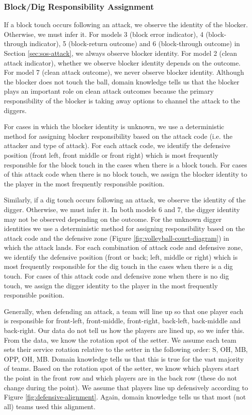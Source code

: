 \documentclass[USenglish]{article}
\theoremstyle{dgthm}
\theoremstyle{dgdef}
\begin{document}
\subsubsection{Block/Dig Responsibility Assignment}
\label{sec:block-dig-responsibility}

If a block touch occurs following an attack, we observe the identity of the blocker. Otherwise, we must infer it. For models 3 (block error indicator), 4 (block-through indicator), 5 (block-return outcome) and 6 (block-through outcome) in Section \ref{sec:sos-attack}, we always observe blocker identity. For model 2 (clean attack indicator), whether we observe blocker identity depends on the outcome. For model 7 (clean attack outcome), we never observe blocker identity. Although the blocker does not touch the ball, domain knowledge tells us that the blocker plays an important role on clean attack outcomes because the primary responsibility of the blocker is taking away options to channel the attack to the diggers.

For cases in which the blocker identity is unknown, we use a deterministic method for assigning blocker responsibility based on the attack code (i.e. the attacker and type of attack). For each attack code, we identify the defensive position (front left, front middle or front right) which is most frequently responsible for the block touch in the cases when there is a block touch. For cases of this attack code when there is no block touch, we assign the blocker identity to the player in the most frequently responsible position.

Similarly, if a dig touch occurs following an attack, we observe the identity of the digger. Otherwise, we must infer it. In both models 6 and 7, the digger identity may not be observed depending on the outcome. For the unknown digger identities we use a deterministic method for assigning responsibility based on the attack code and the defensive zone (Figure \ref{fig:volleyball-court-diagram}) in which the attack lands. For each combination of attack code and defensive zone, we identify the defensive position (front or back; left, middle or right) which is most frequently responsible for the dig touch in the cases when there is a dig touch. For cases of this attack code and defensive zone when there is no dig touch, we assign the digger identity to the player in the most frequently responsible position.

Generally, when defending an attack, a team will line up so that one player each is responsible for front-left, front-middle, front-right, back-left, back-middle and back-right. Our data do not tell us how the players are lined up, so we infer this. From the data, we know the rotation spot of the setter. We assume each team sets their service rotation relative to the setter in the following order: S, OH, MB, OPP, OH, MB. Domain knowledge tells us that this is true for the vast majority of teams. Based on the rotation spot of the setter, we know which players start the point in the front row and which players are in the back row (these do not change during the point). We assume that players line up defensively according to Figure \ref{fig:defensive-alignment}. Again, domain knowledge tells us that most (not all) teams used this alignment.
\end{document}
